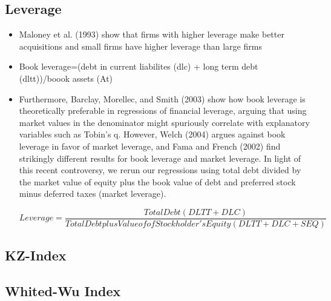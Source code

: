 \documentclass[12pt]{article}
\begin{document}
\subsection{Leverage}

    \begin{itemize}
        \item Maloney et al. (1993) show that firms with higher leverage make better acquisitions and small firms have higher leverage than large firms \citep{Moeller2004}  
        
        \item Book leverage=(debt in current liabilites (dlc) + long term debt (dltt))/boook assets (At) \citep{DUCHIN2010}

        \item Furthermore, Barclay, Morellec, and Smith (2003) show how book leverage is theoretically preferable in regressions of financial leverage, arguing that using market values in the denominator might spuriously correlate with explanatory variables such as Tobin’s q. However, Welch (2004) argues against book leverage in favor of market leverage, and Fama and French (2002) find strikingly different results for book leverage and market leverage. In light of this recent controversy, we rerun our regressions using total debt divided by the market value of equity plus the book value of debt and preferred stock minus deferred taxes (market leverage). \citep{MacKay2005}

        \begin{displaymath}
            Leverage = \frac{Total Debt (DLTT+DLC)}{Total Debt plus Value of of Stockholder's Equity (DLTT+DLC+SEQ)}
        \end{displaymath}
    \end{itemize}

\subsection{KZ-Index}


\subsection{Whited-Wu Index}
\end{document}
